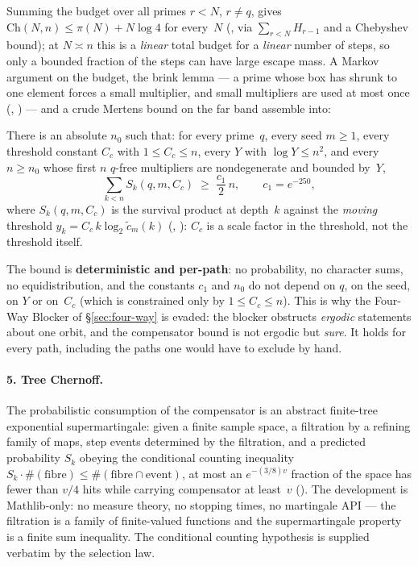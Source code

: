 \noindent Summing the budget over all primes $r < N$, $r \neq q$, gives
$\mathrm{Ch}(N,n) \le \pi(N) + N\log 4$ for every~$N$
(, via
$\sum_{r<N} H_{r-1}$ and a Chebyshev bound); at $N \asymp n$ this is a
\emph{linear} total budget for a \emph{linear} number of steps, so only a
bounded fraction of the steps can have large escape mass.  A Markov
argument on the budget, the brink lemma --- a prime whose box has shrunk to
one element forces a small multiplier, and small multipliers are used at
most once
(,
 ) ---
and a crude Mertens bound on the far band assemble into:

\begin{theorem}
\label{thm:pathwise-compensator}
There is an absolute $n_0$ such that: for every prime~$q$, every seed
$m \geq 1$, every threshold constant $C_c$ with $1 \le C_c \le n$, every
$Y$ with $\log Y \le n^2$, and every $n \geq n_0$ whose first $n$ $q$-free
multipliers are nondegenerate and bounded by~$Y$,
\[
  \sum_{k<n} S_k(q,m,C_c) \;\geq\; \frac{c_1}{2}\, n,
  \qquad c_1 = e^{-250},
\]
where $S_k(q,m,C_c)$ is the survival product at depth~$k$ against the
\emph{moving} threshold $y_k = C_c\,k\log_2 \tilde c_m(k)$
(,
): $C_c$ is a
scale factor in the threshold, not the threshold itself.
\end{theorem}

The bound is \textbf{deterministic and per-path}: no probability, no
character sums, no equidistribution, and the constants $c_1$ and $n_0$ do
not depend on $q$, on the seed, on $Y$ or on~$C_c$ (which is constrained
only by $1 \le C_c \le n$).  This
is why the Four-Way Blocker of \S\ref{sec:four-way} is evaded: the blocker
obstructs \emph{ergodic} statements about one orbit, and the compensator
bound is not ergodic but \emph{sure}.  It holds for every path, including
the paths one would have to exclude by hand.

\paragraph{5.  Tree Chernoff.}
The probabilistic consumption of the compensator is an abstract finite-tree
exponential supermartingale: given a finite sample space, a filtration by a
refining family of maps, step events determined by the filtration, and a
predicted probability $S_k$ obeying the conditional counting inequality
$S_k \cdot \#(\text{fibre}) \leq \#(\text{fibre} \cap \text{event})$, at
most an $e^{-(3/8)v}$ fraction of the space has fewer than $v/4$ hits while
carrying compensator at least~$v$
().  The
development is Mathlib-only: no measure theory, no stopping times, no
martingale API --- the filtration is a family of finite-valued functions and
the supermartingale property is a finite sum inequality.  The conditional
counting hypothesis is supplied verbatim by the selection law.

